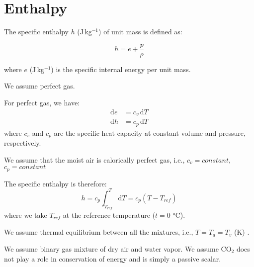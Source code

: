 \section*{Enthalpy}

The specific enthalpy $h$ (J\,kg$^{-1}$) of unit mass is defined as:

\begin{equation}
h = e + \frac{p}{\rho}
\end{equation}

where $e$ (J\,kg$^{-1}$) is the specific internal energy per unit mass. 

\begin{assumption}
	We assume perfect gas.
\end{assumption}

For perfect gas, we have:
\begin{align}
\mathrm{d}e &= c_v \,\mathrm{d}T\\
\mathrm{d}h &= c_p \,\mathrm{d}T
\end{align}
where $c_v$ and $c_p$ are the specific heat capacity at constant volume and pressure, respectively.
\begin{assumption}
	We assume that the moist air is calorically perfect gas, i.e., $c_v=\textit{constant}$, $c_p=\textit{constant}$
\end{assumption}
The specific enthalpy is therefore:
\begin{equation}
h = c_p \int^T_{T_{\textit{ref}}} \mathrm{d}T = c_p \left(T - T_{\textit{ref}}\right)
\end{equation}
where we take $T_{\textit{ref}}$ at the reference temperature ($t=0$ \si{\degreeCelsius}).

\begin{assumption}
	We assume thermal equilibrium between all the mixtures, i.e., $T = T_a = T_v$ (K) \citep{Defraeye2011}.
\end{assumption}

\begin{assumption}
	We assume binary gas mixture of dry air and water vapor. We assume CO$_2$ does not play a role in conservation of energy and is simply a passive scalar.
\end{assumption}

